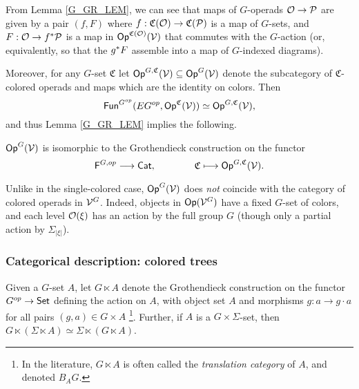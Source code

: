 \documentclass[a4paper,10pt
,draft
]{article}%
\renewcommand{\1}{\ensuremath{\mathbb{id}}}
\begin{document}
From Lemma \ref{G_GR_LEM}, we can see that
maps of $G$-operads $\mathcal{O} \to \mathcal{P}$ are given by a pair $(f, F)$ where
$f: \mathfrak C(\mathcal{O}) \to \mathfrak C(\mathcal{P})$ is a map of $G$-sets, and
$F: \O \to f^{\**}\P$ is a map in $\mathsf{Op}^{\mathfrak C(\mathcal{O})}(\mathcal V)$ that commutes with the $G$-action
(or, equivalently, so that the $g^{\**}F$ assemble into a map of $G$-indexed diagrams).

Moreover, for any $G$-set $\mathfrak C$ let $\mathsf{Op}^{G, \mathfrak C}(\mathcal V) \subseteq \mathsf{Op}^G(\mathcal V)$
denote the subcategory of $\mathfrak C$-colored operads and maps which are the identity on colors.
Then 
\begin{equation}
      \mathsf{Fun}^{G^{op}}(E G^{op}, \mathsf{Op}^{\mathfrak C}(\mathcal V)) \simeq \mathsf{Op}^{G, \mathfrak C}(\mathcal V),
\end{equation}
and thus Lemma \ref{G_GR_LEM} implies the following.
\begin{lemma}
      $\mathsf{Op}^G(\mathcal V)$ is isomorphic to the Grothendieck construction on the functor
      \begin{equation}
            \mathsf F^{G,op} \longrightarrow \mathsf{Cat},
            \qquad \qquad
            \mathfrak C \longmapsto \mathsf{Op}^{G, \mathfrak C}(\mathcal V).
      \end{equation}
\end{lemma}


\begin{remark}
	Unlike in the single-colored case, $\mathsf{Op}^G(\mathcal V)$ does \textit{not} coincide with the category of colored operads in $\mathcal V^G$.
	Indeed, objects in $\mathsf{Op}(\mathcal V^G)$ have a fixed $G$-set of colors,
        and each level $\mathcal{O}(\xi)$ has an action by the full group $G$
	(though only a partial action by $\Sigma_{|\xi|}$).
\end{remark}


\subsubsection{Categorical description: colored trees}
\label{COMEGA_SEC}

Given a $G$-set $A$, let $G \ltimes A$ denote the Grothendieck construction on the functor $G^{op} \to \mathsf{Set}$
defining the action on $A$,
with object set $A$ and morphisms $g: a \to g\cdot a$ for all pairs $(g,a) \in G \times A$
\footnote{In the literature, $G \ltimes A$ is often called the \textit{translation category} of $A$, and denoted $B_A G$.}.
Further, if $A$ is a $G \times \Sigma$-set, then $G \ltimes (\Sigma \ltimes A) \simeq \Sigma \ltimes (G \ltimes A)$.
\end{document}

